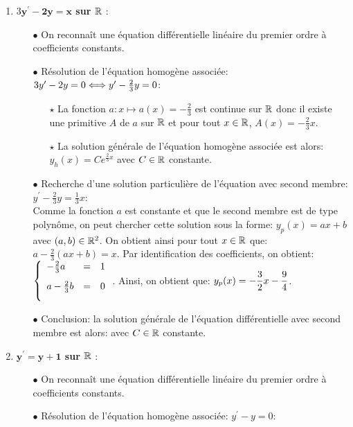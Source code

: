 \documentclass[a4paper, 11pt,reqno]{article}
\begin{document}
\begin{correction}
\begin{enumerate}
    \item \textbf{$3\mathbf{y^{\prime}-2y=x}$ sur $\mathbb{R}$} :\\
          \begin{itemize}
            \item[$\bullet$] On reconna\^{i}t une \'equation diff\'erentielle lin\'eaire du premier ordre \`{a} coefficients  constants.
            \item[$\bullet$] R\'esolution de l'\'equation homog\`{e}ne associ\'ee: $3y^{\prime}-2y=0 \Longleftrightarrow y^{\prime}-\frac{2}{3}y=0 $:\\
                  \begin{itemize}
                    \item[$\star$] La fonction $a: x\mapsto a(x)=-\frac{2}{3}$ est continue sur $\mathbb{R}$ donc il existe une primitive $A$ de $a$ sur $\mathbb{R}$ et pour tout $x\in\mathbb{R}$, $A(x)=-\frac{2}{3}x$.
                    \item[$\star$] La solution g\'en\'erale de l'\'equation homog\`{e}ne associ\'ee est alors: $y_h(x) = Ce^{\frac{2}{3}x}$ avec $C\in\mathbb{R}$ constante.
                  \end{itemize}
            \item[$\bullet$] Recherche d'une solution particuli\`{e}re de l'\'equation avec second membre: $y^{\prime}-\frac{2}{3}y=\frac{1}{3}x$:\\
                  \noindent Comme la fonction $a$ est constante et que le second membre est de type polyn\^{o}me, on peut chercher cette solution sous la forme: $y_p(x)= ax+b$ avec $(a,b)\in\mathbb{R}^2$. On obtient ainsi pour tout $x\in\mathbb{R}$ que: $a-\frac{2}{3}(ax+b) =x$. Par identification des coefficients, on obtient:
                  $\left\lbrace \begin{array}{lll}  -\frac{2}{3}a&=&1\vsec\\ a-\frac{2}{3}b&=&0\vsec\\ \end{array} \right.$. Ainsi, on obtient que: $y_p(x)= -\displaystyle\frac{3}{2}x-\frac{9}{4}$.
            \item[$\bullet$] Conclusion: la solution g\'en\'erale de l'\'equation diff\'erentielle avec second membre est alors:  avec $C\in\mathbb{R}$ constante.
          \end{itemize}


    \item \textbf{$\mathbf{y^{\prime}=y+1}$ sur $\mathbb{R}$} :\\
          \begin{itemize}
            \item[$\bullet$] On reconna\^{i}t une \'equation diff\'erentielle lin\'eaire du premier ordre \`{a} coefficients  constants.
            \item[$\bullet$] R\'esolution de l'\'equation homog\`{e}ne associ\'ee: $y^{\prime}-y=0 $:\\
                  \begin{itemize}


\end{itemize}
\end{itemize}
\end{enumerate}
\end{correction}
\end{document}
